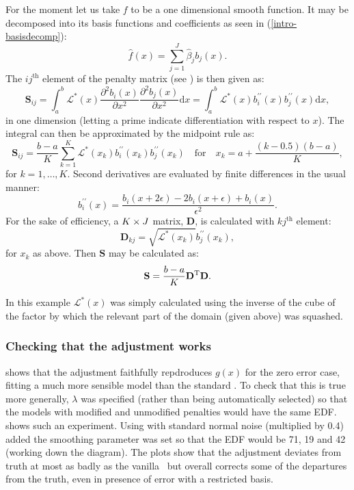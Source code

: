 For the moment let us take $f$ to be a one dimensional smooth function. It may be decomposed into its basis functions and coefficients as seen in (\ref{intro-basisdecomp}):
\begin{equation*}
\hat{f}(x)=\sum_{j=1}^J \hat{\beta}_j b_j(x).
\end{equation*}
The $ij^\text{th}$ element of the penalty matrix (see ) is then given as:
\begin{equation*}
\mathbf{S}_{ij}= \int_a^b \mathcal{L}^*(x) \frac{\partial^2 b_i(x)}{\partial x^2}\frac{\partial^2 b_j(x)}{\partial x^2} \text{d}x = \int_a^b \mathcal{L}^*(x) b^{\prime\prime}_i(x) b^{\prime\prime}_j(x) \text{d}x,
\end{equation*}
in one dimension (letting a prime indicate differentiation with respect to $x$). The integral can then be approximated by the midpoint rule as:
\begin{equation}
\mathbf{S}_{ij}= \frac{b-a}{K}\sum_{k=1}^K \mathcal{L}^*(x_k) b^{\prime\prime}_i(x_k) b^{\prime\prime}_j(x_k) \quad \text{for} \quad x_k=a+\frac{(k-0.5)(b-a)}{K},
\label{midpointS}
\end{equation}
for $k=1,\dots, K$. Second derivatives are evaluated by finite differences in the usual manner:
\begin{equation}
\label{bfinitediff}
b^{\prime\prime}_i(x) = \frac{ b_i(x+2\epsilon) - 2b_i(x+\epsilon) + b_i(x)}{\epsilon^2}.
\end{equation}
For the sake of efficiency, a $K\times J$ matrix, $\mathbf{D}$, is calculated with $kj^\text{th}$ element:
\begin{equation}
\mathbf{D}_{kj}=\sqrt{\mathcal{L}^*(x_k)} b^{\prime\prime}_j(x_k),
\label{oneDD}
\end{equation}
for $x_k$ as above. Then $\mathbf{S}$ may be calculated as:
\begin{equation*}
\mathbf{S}=\frac{b-a}{K}\mathbf{D}^{\text{T}}\mathbf{D}.
\end{equation*}

In this example $\mathcal{L}^*(x)$ was simply calculated using the inverse of the cube of the factor by which the relevant part of the domain (given above) was squashed. 

\subsubsection{Checking that the adjustment works}

 shows that the adjustment faithfully repdroduces $g(x)$ for the zero error case, fitting a much more sensible model than the standard \tprs. To check that this is true more generally, $\lambda$ was specified (rather than being automatically selected) so that the models with modified and unmodified penalties would have the same EDF.  shows such an experiment. Using  with standard normal noise (multiplied by 0.4) added the smoothing parameter was set so that the EDF would be 71, 19 and 42 (working down the diagram). The plots show that the adjustment deviates from truth at most as badly as the vanilla \tprs\ but overall corrects some of the departures from the truth, even in presence of error with a restricted basis.

